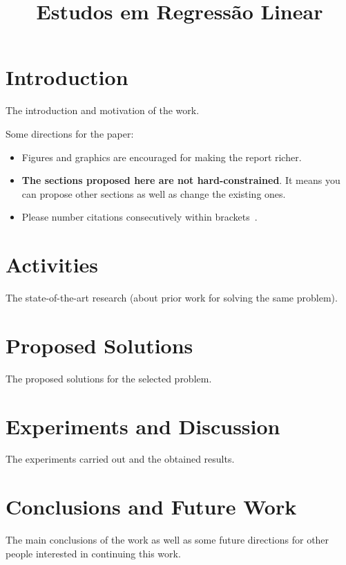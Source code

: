 \documentclass[conference]{IEEEtran}
\begin{document}
\title{Estudos em Regressão Linear}

\author{
\and
{}
}

\maketitle

\section{Introduction}

The introduction and motivation of the work.

Some directions for the paper:

\begin{itemize}
	\item Figures and graphics are encouraged for making the
	report richer.
	\item {\bf The sections proposed here are not hard-constrained}. It means you can propose other sections as well as change the existing ones.
	\item Please number citations consecutively within brackets~\cite{b1}.
\end{itemize}

\section{Activities}

The state-of-the-art research (about prior work for solving the same problem).

\section{Proposed Solutions}

The proposed solutions for the selected problem.

\section{Experiments and Discussion}

The experiments carried out and the obtained
results.

\section{Conclusions and Future Work}

The main conclusions of the work as well as some future directions for other people interested in continuing this work.



\end{document}
